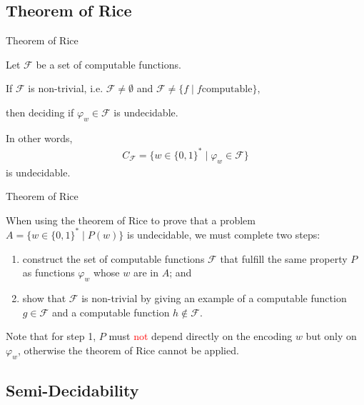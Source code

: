 \documentclass{beamer}
\theoremstyle{definition}
\def\spadding{\vspace{0.25cm}}
\def\r{\textcolor{red}}
\begin{document}
\subsection{Theorem of Rice}

\begin{frame}{Theorem of Rice}
    \begin{theorem}
        Let $\mathcal{F}$ be a set of computable functions.\pause\par
        If $\mathcal{F}$ is non-trivial, i.e. $\mathcal{F} \neq \emptyset$ and $\mathcal{F} \neq \{f \mid f \text{computable}\}$,\pause\par
        then deciding if $\varphi_w \in \mathcal{F}$ is undecidable.\pause\par\spadding
        In other words, \begin{align*}
            C_{\mathcal{F}} = \{w \in \{0,1\}^* \mid \varphi_w \in \mathcal{F}\}
        \end{align*} is undecidable.
    \end{theorem}
\end{frame}

\begin{frame}{Theorem of Rice}
    \begin{example}
        When using the theorem of Rice to prove that a problem $A = \{w \in \{0,1\}^* \mid P(w)\}$ is undecidable, we must complete two steps:\pause
        \begin{enumerate}
            \item construct the set of computable functions $\mathcal{F}$ that fulfill the same property $P$ as functions $\varphi_w$ whose $w$ are in $A$\pause; and
            \item show that $\mathcal{F}$ is non-trivial by giving an example of a computable function $g \in \mathcal{F}$ and a computable function $h \not\in \mathcal{F}$.
        \end{enumerate}\pause
        Note that for step 1, $P$ must \r{not} depend directly on the encoding $w$ but only on $\varphi_w$, otherwise the theorem of Rice cannot be applied.
    \end{example}
\end{frame}

\subsection{Semi-Decidability}
\end{document}
